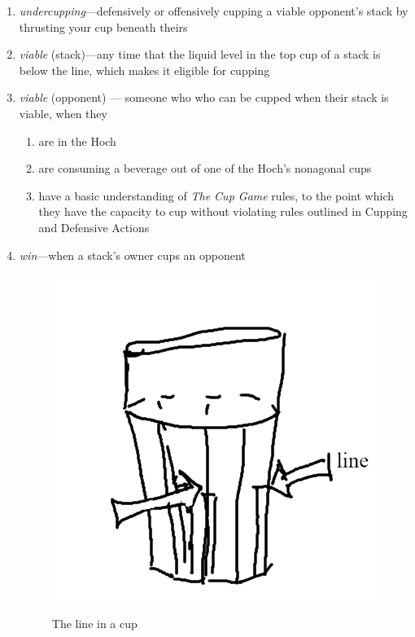 \documentclass[12pt]{IEEEtran}
\begin{document}
\begin{enumerate}
    \item \textit{undercupping}---defensively or offensively cupping a viable opponent's stack by thrusting your cup beneath theirs
    \item \textit{viable} (stack)---any time that the liquid level in the top cup of a stack is below the line, which makes it eligible for cupping
    \item \textit{viable} (opponent) --- someone who who can be cupped when their stack is viable, when they
          \begin{enumerate}
              \item are in the Hoch
              \item are consuming a beverage out of one of the Hoch's nonagonal cups
              \item have a basic understanding of \textit{The Cup Game} rules, to the point which they have the capacity to cup without violating rules outlined in Cupping and Defensive Actions
          \end{enumerate}
    \item \textit{win}---when a stack's owner cups an opponent
          \begin{figure}
              \begin{center}
                  \includegraphics[width=0.7\linewidth]{line.png}
                  \label{fig:line}
                  \caption{The line in a cup}
              \end{center}
          \end{figure}
          \begin{figure}
            \begin{center}

\end{center}
\end{figure}
\end{enumerate}
\end{document}

